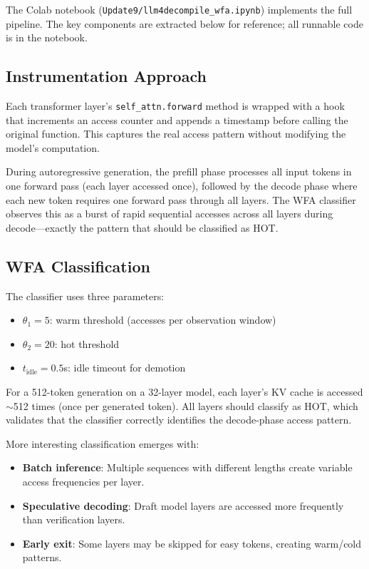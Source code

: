 \documentclass[11pt,letterpaper]{article}
\begin{document}
The Colab notebook (\texttt{Update9/llm4decompile\_wfa.ipynb}) implements the full pipeline. The key components are extracted below for reference; all runnable code is in the notebook.

\subsection{Instrumentation Approach}

Each transformer layer's \texttt{self\_attn.forward} method is wrapped with a hook that increments an access counter and appends a timestamp before calling the original function. This captures the real access pattern without modifying the model's computation.

During autoregressive generation, the prefill phase processes all input tokens in one forward pass (each layer accessed once), followed by the decode phase where each new token requires one forward pass through all layers. The WFA classifier observes this as a burst of rapid sequential accesses across all layers during decode---exactly the pattern that should be classified as HOT.

\subsection{WFA Classification}

The classifier uses three parameters:
\begin{itemize}
    \item $\theta_1 = 5$: warm threshold (accesses per observation window)
    \item $\theta_2 = 20$: hot threshold
    \item $t_{\text{idle}} = 0.5$s: idle timeout for demotion
\end{itemize}

For a 512-token generation on a 32-layer model, each layer's KV cache is accessed $\sim$512 times (once per generated token). All layers should classify as HOT, which validates that the classifier correctly identifies the decode-phase access pattern.

More interesting classification emerges with:
\begin{itemize}
    \item \textbf{Batch inference}: Multiple sequences with different lengths create variable access frequencies per layer.
    \item \textbf{Speculative decoding}: Draft model layers are accessed more frequently than verification layers.
    \item \textbf{Early exit}: Some layers may be skipped for easy tokens, creating warm/cold patterns.
\end{itemize}
\end{document}
